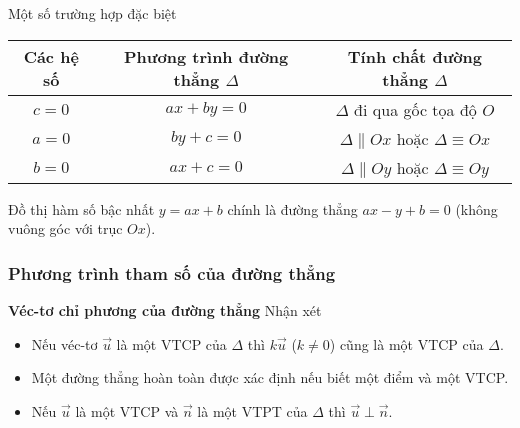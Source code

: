  Một số trường hợp đặc biệt
	\begin{center}
		\renewcommand{\arraystretch}{2}%
		\begin{tabular}{|c|c|c|}
			\hline 
			Các hệ số & Phương trình đường thẳng $\Delta$ & Tính chất đường thẳng $\Delta$ \\ 
			\hline 
			$c=0$ & $ax+by =0$ & $\Delta$ đi qua gốc tọa độ $O$ \\ 
			\hline 
			$a=0$ & $by+c=0$ & $\Delta \parallel Ox$ hoặc $\Delta  \equiv Ox$ \\ 
			\hline 
			$b=0$ & $ax+c=0$ &  $\Delta \parallel Oy$ hoặc $\Delta  \equiv Oy$ \\ 
			\hline 
		\end{tabular} 
	\end{center}


\begin{note}
	Đồ thị hàm số bậc nhất $y=ax+b$ chính là đường thẳng $ax-y+b=0$ (không vuông góc với trục $Ox$).
\end{note}

\subsubsection{Phương trình tham số của đường thẳng}
\textbf{Véc-tơ chỉ phương của đường thẳng}
		Nhận xét 
		\begin{itemize}
			\item Nếu véc-tơ $\overrightarrow{u}$  là một VTCP của $\Delta$ thì $k \overrightarrow{u}$ ($k \ne 0 $) cũng là một VTCP của $\Delta$. 
			\item Một đường thẳng hoàn toàn được xác định nếu biết một điểm và một VTCP.
			\item Nếu $\overrightarrow{u}$ là một VTCP và $\overrightarrow{n}$ là một VTPT của $\Delta$ thì $\overrightarrow{u} \perp \overrightarrow{n}$.
		\end{itemize}

